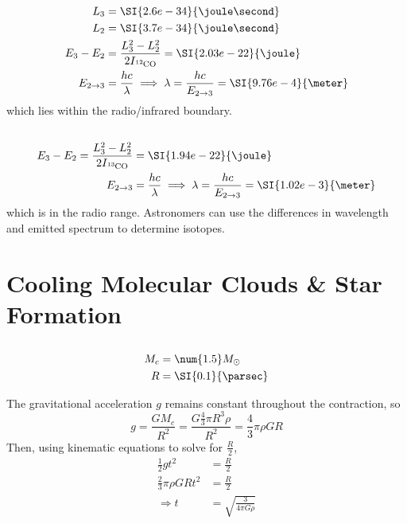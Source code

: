 \documentclass{article}
\begin{document}
\subsection{}

\begin{align}
    L_3 &= \SI{2.6e-34}{\joule\second} \\
    L_2 &= \SI{3.7e-34}{\joule\second} \\
    E_3 - E_2 &= \frac{L_3^2 - L_2^2}{2I_{\ce{^{12}CO}}} = \SI{2.03e-22}{\joule} \\
    E_{2 \to 3} &= \frac{h c}{\lambda} \implies \lambda = \frac{h c}{E_{2 \to 3}} = \SI{9.76e-4}{\meter}
\end{align}
which lies within the radio/infrared boundary.

\subsection{}

\begin{align}
    E_3 - E_2 = \frac{L_3^2 - L_2^2}{2I_{\ce{^{13}CO}}} &= \SI{1.94e-22}{\joule} \\
    E_{2 \to 3} &= \frac{h c}{\lambda} \implies \lambda = \frac{h c}{E_{2 \to 3}} = \SI{1.02e-3}{\meter}
\end{align}
which is in the radio range.
Astronomers can use the differences in wavelength and emitted spectrum to determine isotopes.

\section{Cooling Molecular Clouds \& Star Formation}

\subsection{}

\begin{align}
    M_c &= \num{1.5} M_\odot \\
    R &= \SI{0.1}{\parsec}
\end{align}

The gravitational acceleration \(g\) remains constant throughout the contraction, so
\begin{equation}
    g = \frac{G M_c}{R^2} = \frac{G \frac{4}{3} \pi R^3 \rho}{R^2} = \frac{4}{3} \pi \rho G R
\end{equation}
Then, using kinematic equations to solve for \(\frac{R}{2}\),
\begin{align}
    \frac{1}{2} g t^2 &= \frac{R}{2} \\
    \frac{2}{3} \pi \rho G R t^2 &= \frac{R}{2} \\
    \Rightarrow t &= \sqrt{\frac{3}{4 \pi G \rho}}
\end{align}
\end{document}
